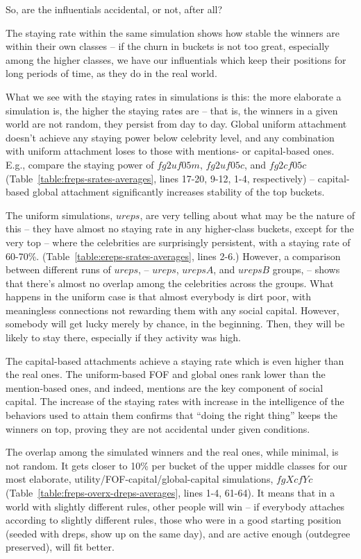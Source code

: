 \documentclass[10pt,oneside]{memoir}
\begin{document}
\label{sec:simulation-results}
So, are the influentials accidental, or not, after all?


The staying rate within the same simulation shows how stable the winners are within their own classes -- if the churn in buckets is not too great, especially among the higher classes, we have our influentials which keep their positions for long periods of time, as they do in the real world.


What we see with the staying rates in simulations is this: the more elaborate a simulation is, the higher the staying rates are -- that is, the winners in a given world are not random, they persist from day to day.  Global uniform attachment doesn't achieve any staying power below celebrity level, and any combination with uniform attachment loses to those with mentions- or capital-based ones.  E.g., compare the staying power of $fg2uf05m$, $fg2uf05c$, and $fg2cf05c$ (Table~\ref{table:freps-srates-averages}, lines 17-20, 9-12, 1-4, respectively) -- capital-based global attachment significantly increases stability of the top buckets.


The uniform simulations, $ureps$, are very telling about what may be the nature of this -- they have almost no staying rate in any higher-class buckets, except for the very top -- where the celebrities are surprisingly persistent, with a staying rate of 60-70\%.  (Table~\ref{table:ereps-srates-averages}, lines 2-6.)  However, a comparison between different runs of $ureps$, -- $ureps$, $urepsA$, and $urepsB$ groups, -- shows that there's almost no overlap among the celebrities across the groups.  What happens in the uniform case is that almost everybody is dirt poor, with meaningless connections not rewarding them with any social capital.  However, somebody will get lucky merely by chance, in the beginning.  Then, they will be likely to stay there, especially if they activity was high.


The capital-based attachments achieve a staying rate which is even higher than the real ones.  The uniform-based FOF and global ones rank lower than the mention-based ones, and indeed, mentions are the key component of social capital.  The increase of the staying rates with increase in the intelligence of the behaviors used to attain them confirms that ``doing the right thing'' keeps the winners on top, proving they are not accidental under given conditions.


The overlap among the simulated winners and the real ones, while minimal, is not random.  It gets closer to 10\% per bucket of the upper middle classes for our most elaborate, utility/FOF-capital/global-capital simulations, $fgXcfYc$ (Table~\ref{table:freps-overx-dreps-averages}, lines 1-4, 61-64).  It means that in a world with slightly different rules, other people will win -- if everybody attaches according to slightly different rules, those who were in a good starting position (seeded with dreps, show up on the same day), and are active enough (outdegree preserved), will fit better.
\end{document}
